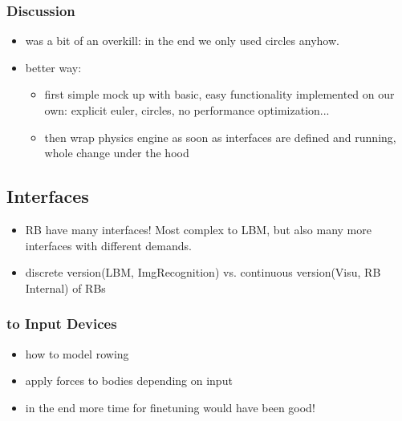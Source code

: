 
\subsubsection{Discussion}
\begin{itemize}
\item was a bit of an overkill: in the end we only used circles anyhow.
\item better way: 
\begin{itemize}
\item first simple mock up with basic, easy functionality implemented on our own: explicit euler, circles, no performance optimization...
\item then wrap physics engine as soon as interfaces are defined and running, whole change under the hood
\end{itemize}
\end{itemize}

\subsection{Interfaces}
\begin{itemize}
\item RB have many interfaces! Most complex to LBM, but also many more interfaces with different demands.
\item discrete version(LBM, ImgRecognition) vs. continuous version(Visu, RB Internal) of RBs
\end{itemize}
\subsubsection{to Input Devices}
\begin{itemize}
\item how to model rowing
\item apply forces to bodies depending on input
\item in the end more time for finetuning would have been good!
\end{itemize}

